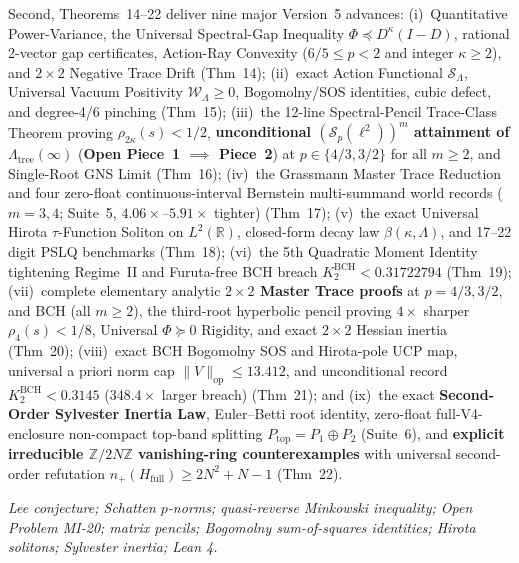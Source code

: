 \documentclass[10pt,letterpaper]{article}
\newcommand{\R}{\mathbb{R}}
\newcommand{\Sp}{\mathcal{S}_p}
\newcommand{\op}{\mathrm{op}}
\begin{document}
\begin{tcolorbox}[abstractbox]
{Second, Theorems~14--22 deliver nine major Version~5 advances: (i)~Quantitative Power-Variance, the Universal Spectral-Gap Inequality $\Phi \preceq D^\kappa(I-D)$, rational 2-vector gap certificates, Action-Ray Convexity ($6/5 \le p < 2$ and integer $\kappa \ge 2$), and $2\times 2$ Negative Trace Drift (Thm~14); (ii)~exact Action Functional $\mathcal{S}_\Lambda$, Universal Vacuum Positivity $\mathcal{W}_\Lambda \ge 0$, Bogomolny/SOS identities, cubic defect, and degree-4/6 pinching (Thm~15); (iii)~the 12-line Spectral-Pencil Trace-Class Theorem proving $\rho_{2\kappa}(s) < 1/2$, \textbf{unconditional $(\Sp(\ell^2))^m$ attainment of $\Lambda_{\mathrm{tree}}(\infty)$} (\textbf{Open Piece~1 $\implies$ Piece~2}) at $p \in \{4/3, 3/2\}$ for all $m \ge 2$, and Single-Root GNS Limit (Thm~16); (iv)~the Grassmann Master Trace Reduction and four zero-float continuous-interval Bernstein multi-summand world records ($m = 3, 4$; Suite~5, $4.06\times$--$5.91\times$ tighter) (Thm~17); (v)~the exact Universal Hirota $\tau$-Function Soliton on $L^2(\R)$, closed-form decay law $\beta(\kappa,\Lambda)$, and 17--22 digit PSLQ benchmarks (Thm~18); (vi)~the 5th Quadratic Moment Identity tightening Regime~II and Furuta-free BCH breach $K_2^{\mathrm{BCH}} < 0.31722794$ (Thm~19); (vii)~complete elementary analytic \textbf{$2\times 2$ Master Trace proofs} at $p = 4/3, 3/2$, and BCH (all $m \ge 2$), the third-root hyperbolic pencil proving $4\times$ sharper $\rho_4(s) < 1/8$, Universal $\Phi \succeq 0$ Rigidity, and exact $2\times 2$ Hessian inertia (Thm~20); (viii)~exact BCH Bogomolny SOS and Hirota-pole UCP map, universal a priori norm cap $\|V\|_{\op} \le 13.412$, and unconditional record \textbf{$K_2^{\mathrm{BCH}} < 0.3145$} ($348.4\times$ larger breach) (Thm~21); and (ix)~the exact \textbf{Second-Order Sylvester Inertia Law}, Euler--Betti root identity, zero-float full-V4-enclosure non-compact top-band splitting $P_{\mathrm{top}} = P_1 \oplus P_2$ (Suite~6), and \textbf{explicit irreducible $\mathbb{Z}/2N\mathbb{Z}$ vanishing-ring counterexamples} with universal second-order refutation $n_+(H_{\mathrm{full}}) \ge 2N^2+N-1$ (Thm~22).
\par\vspace{2.5pt}
 \emph{Lee conjecture; Schatten $p$-norms; quasi-reverse Minkowski inequality; Open Problem MI-20; matrix pencils; Bogomolny sum-of-squares identities; Hirota solitons; Sylvester inertia; Lean 4.}
}
\end{tcolorbox}
\end{document}
